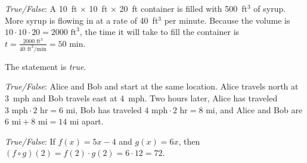 \documentclass[11pt,letterpaper]{article}
\begin{document}
\quizsol \textit{True/False}: A 10~ft $\times$ 10~ft $\times$ 20~ft container is filled with 500~ft$^3$ of syrup. More syrup is flowing in at a rate of 40~ft$^3$ per minute. Because the volume is $10 \cdot 10 \cdot 20= 2000 \text{ ft}^3$, the time it will take to fill the container is $t= \frac{2000 \text{ ft}^3}{40 \text{ ft}^3/\text{min}}= 50 \text{ min}$. \pspace

\sol The statement is \textit{true}.


\quizsol \textit{True/False}: Alice and Bob and start at the same location. Alice travels north at 3~mph and Bob travels east at 4~mph. Two hours later, Alice has traveled $3 \text{ mph} \cdot 2 \text{ hr}= 6 \text{ mi}$, Bob has traveled $4 \text{ mph} \cdot 2 \text{ hr}= 8 \text{ mi}$, and Alice and Bob are $6 \text{ mi} + 8 \text{ mi}= 14 \text{ mi}$ apart. \pspace

\quizsol \textit{True/False}: If $f(x)= 5x - 4$ and $g(x)= 6x$, then $(f \circ g)(2)= f(2) \cdot g(2)= 6 \cdot 12= 72$. \pspace

\end{document}
